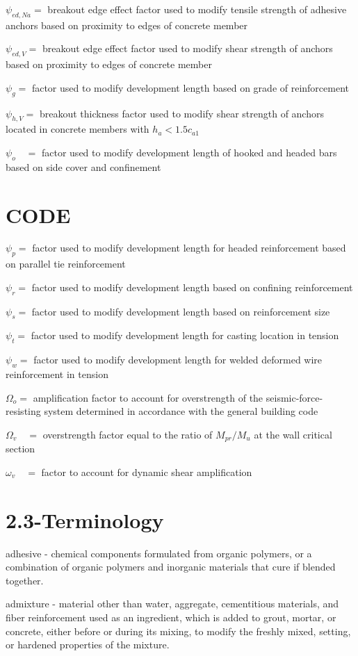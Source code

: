 \documentclass[10pt]{article}
\begin{document}
$\psi_{e d, N a}=$ breakout edge effect factor used to modify tensile strength of adhesive anchors based on proximity to edges of concrete member

$\psi_{e d, V}=$ breakout edge effect factor used to modify shear strength of anchors based on proximity to edges of concrete member

$\psi_{g}=$ factor used to modify development length based on grade of reinforcement

$\psi_{h, V}=$ breakout thickness factor used to modify shear strength of anchors located in concrete members with $h_{a}<1.5 c_{a 1}$

$\psi_{o} \quad=$ factor used to modify development length of hooked and headed bars based on side cover and confinement

\section*{CODE}
$\psi_{p}=$ factor used to modify development length for headed reinforcement based on parallel tie reinforcement

$\psi_{r}=$ factor used to modify development length based on confining reinforcement

$\psi_{s}=$ factor used to modify development length based on reinforcement size

$\psi_{t}=$ factor used to modify development length for casting location in tension

$\psi_{w}=$ factor used to modify development length for welded deformed wire reinforcement in tension

$\Omega_{o}=$ amplification factor to account for overstrength of the seismic-force-resisting system determined in accordance with the general building code

$\Omega_{v} \quad=$ overstrength factor equal to the ratio of $M_{p r} / M_{u}$ at the wall critical section

$\omega_{v} \quad=$ factor to account for dynamic shear amplification

\section*{2.3-Terminology}
adhesive - chemical components formulated from organic polymers, or a combination of organic polymers and inorganic materials that cure if blended together.

admixture - material other than water, aggregate, cementitious materials, and fiber reinforcement used as an ingredient, which is added to grout, mortar, or concrete, either before or during its mixing, to modify the freshly mixed, setting, or hardened properties of the mixture.
\end{document}
